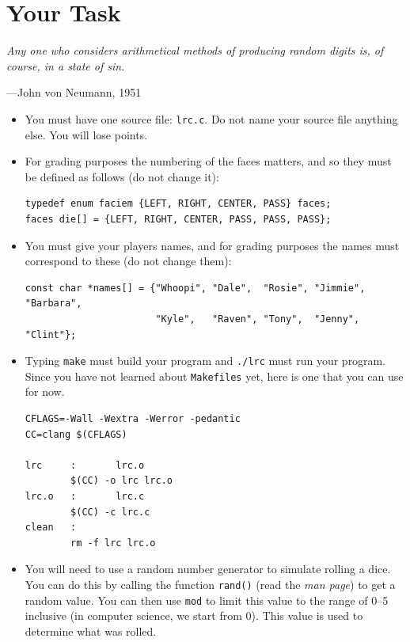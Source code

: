 \documentclass{article}
\begin{document}

\section{Your Task}
\textwidth
\epigraph{
\emph{Any one who considers arithmetical methods of producing random digits
is, of course, in a state of sin.}}{---John von Neumann, 1951}

\begin{itemize}

\item You must have one source file: \texttt{lrc.c}. Do not name
your source file anything else. You will lose points.


\item For grading purposes the numbering of the faces matters, and
so they must be defined as follows (do not change it):

\begin{lstlisting}
typedef enum faciem {LEFT, RIGHT, CENTER, PASS} faces;
faces die[] = {LEFT, RIGHT, CENTER, PASS, PASS, PASS};
\end{lstlisting}

\item You must give your players names, and for grading purposes the names
must correspond to these (do not change them):

{\small
\begin{lstlisting}
const char *names[] = {"Whoopi", "Dale",  "Rosie", "Jimmie", "Barbara",
                       "Kyle",   "Raven", "Tony",  "Jenny",  "Clint"};
\end{lstlisting}
}

\item Typing \texttt{make} must build your program and
\texttt{./lrc} must run your program. Since you have not learned
about \texttt{Makefiles} yet, here is one that you can use for now.

\begin{lstlisting}[title=\texttt{Makefile}]
CFLAGS=-Wall -Wextra -Werror -pedantic
CC=clang $(CFLAGS)

lrc     :       lrc.o
        $(CC) -o lrc lrc.o
lrc.o   :       lrc.c
        $(CC) -c lrc.c
clean   :
        rm -f lrc lrc.o
\end{lstlisting}

\item You will need to use a random number generator to simulate
rolling a dice. You can do this by calling the function \texttt{rand()}
(read the \emph{man page}) to get a random value. You can then use \texttt{mod}
to limit this value to the range of 0--5 inclusive (in computer science, we start from 0).
This value is used to determine what was rolled.


\end{itemize}
\end{document}
